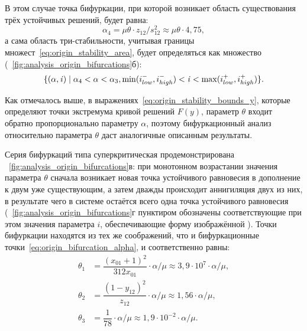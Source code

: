В этом случае точка бифуркации, при которой возникает область существования трёх устойчивых решений, будет равна:
\begin{equation}
    \label{eq:origin_bifurcation_alpha_ext}
    \alpha_{4} = \mu \theta \cdot z_{12} / s_{12}^{2} \approx \mu \theta \cdot 4,75,
\end{equation}
а сама область три-стабильности, учитывая границы множест~\eqref{eq:origin_stability_area}, будет определяться как множество (\seefigure~\ref{fig:analysis_origin_bifurcations}б):
\begin{equation}
    \label{eq:origin_stability_area_ext}
    \{ (\alpha, \mathit{i}) \mid \alpha_{4} < \alpha < \alpha_{3}, \min(i^{-}_{low}, i^{-}_{high}) < \mathit{i} < \max(i^{+}_{low}, i^{+}_{high}) \}.
\end{equation}

Как отмечалось выше, в выражениях~\eqref{eq:origin_stability_bounds_y}, которые определяют точки экстремума кривой решений $F(y)$, параметр $\theta$ входит обратно пропорционально параметру $\alpha$, поэтому бифуркационный анализ относительно параметра $\theta$ даст аналогичные описанным результаты.

Серия бифуркаций типа суперкритическая  продемонстрирована \onfigure~\ref{fig:analysis_origin_bifurcations}в: при монотонном возрастании значения параметра $\theta$ сначала возникает новая точка устойчивого равновесия в дополнение к двум уже существующим, а затем дважды происходит аннигиляция двух из них, в результате чего в системе остаётся всего одна точка устойчивого равновесия (\onfigure~\ref{fig:analysis_origin_bifurcations}г пунктиром обозначены соответствующие при этом значения параметра $i$, обеспечивающие форму изображённой ). Точки бифуркации находятся из тех же соображений, что и бифуркационные точки~\eqref{eq:origin_bifurcation_alpha}, и соответственно равны:
\begin{equation}
    \nonumber
    \begin{aligned}
        \theta_{1} &= \dfrac{(x_{01} + 1)^2}{312 x_{01}} \cdot \alpha / \mu     \approx 3,9 \cdot 10^{7} \cdot \alpha / \mu, \\
        \theta_{2} &= \dfrac{(1 - y_{12})^2}{z_{12}} \cdot \alpha / \mu         \approx 1,56 \cdot \alpha / \mu, \\
        \theta_{3} &= \dfrac{1}{78} \cdot \alpha / \mu                          \approx 1,9 \cdot 10^{-2} \cdot \alpha / \mu.
    \end{aligned}
\end{equation}

